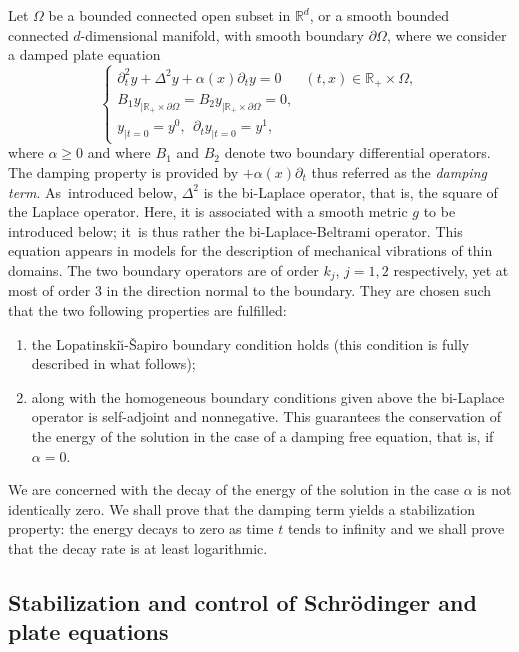 \documentclass[10pt]{amsart}
\theoremstyle{plain}
\theoremstyle{definition}
\def\R{\mathbb{R}}
\newcommand{\LS}{Lopatinski\u{\i}-\v{S}apiro\xspace}
\begin{document}
Let $\Omega$ be a bounded connected open subset in $\R^d$, or a smooth bounded connected $d$-dimensional manifold, with smooth
boundary $\partial\Omega$, where we consider a damped plate equation
\begin{equation}\label{eq: damped plate equation - intro}
\begin{cases}
\partial^2_t y +\Delta^2y+\alpha(x)\partial_t y =0
&(t,x) \in \R_+ \times\Omega,\\
B_1 y_{|\R_+ \times\partial \Omega}= B_2y_{|\R_+ \times\partial \Omega}=0,\\
y_{|t=0}=y^0, \ \ \partial_t y_{|t=0}=y^1,
\end{cases}
\end{equation}
where $\alpha\geq 0$ and
where $B_1$ and $B_2$ denote two boundary differential operators.
The damping property is provided by $+\alpha(x)\partial_t$ thus
referred as the \emph{damping term}.
As~introduced below, $\Delta^2$ is the bi-Laplace operator, that is,
the square of the Laplace operator. Here, it is associated with a
smooth metric $g$ to be introduced below; it~is thus rather the
bi-Laplace-Beltrami operator. This equation appears in models for the description of mechanical vibrations of
thin domains. The two boundary operators are of order $k_j$, $j=1,2$ respectively, yet at most of order $3$ in the direction
normal to the boundary. They
are chosen such that the two following properties are fulfilled:
\begin{enumerate}
\item the \LS boundary condition holds (this condition is fully
described in what follows);
\item along with the homogeneous boundary conditions given above the
bi-Laplace operator is self-adjoint and nonnegative. This guarantees the
conservation of the energy of the solution in the case of a
damping free equation, that is, if $\alpha=0$.
\end{enumerate}
We are concerned with the decay of the energy of the solution in the
case $\alpha$ is not identically zero. We shall prove that the damping
term yields a stabilization property: the energy decays to zero as
time $t$ tends to infinity and we shall prove that the decay rate is at least logarithmic.

\subsection{Stabilization and control of Schrödinger and
plate equations}
\end{document}
